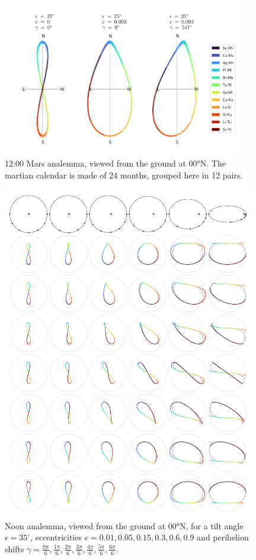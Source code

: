 \documentclass[12pt]{article}
\begin{document}
\begin{figure}
    \centering
    \includegraphics[width=0.92\textwidth]{./figures/comparisonMars.pdf}
    \caption{
        12:00 Mars analemma, viewed from the ground at 00°N. The martian 
        calendar is made of 24 months, grouped here in 12 pairs.
    }
    \label{fig:comparisonMars}
\end{figure}

\begin{figure}
    \centering
    \includegraphics[width=0.98\textwidth]{./figures/mosaic.pdf}
    \caption{
        Noon analemma, viewed from the ground at 00°N, for a tilt angle $\epsilon=35^\circ$, 
        eccentricities $e=0.01, 0.05, 0.15, 0.3, 0.6, 0.9$ and perihelion shifts 
        $\gamma=\tfrac{0\pi}{6},\tfrac{1\pi}{6},\tfrac{2\pi}{6},\tfrac{3\pi}{6},
        \tfrac{4\pi}{6},\tfrac{5\pi}{6},\tfrac{6\pi}{6}$.
    }
    \label{fig:mosaic}
\end{figure}
\end{document}
